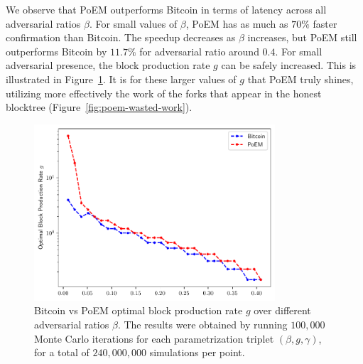 


%
%


We observe that PoEM outperforms Bitcoin in terms of latency across all adversarial ratios $\beta$.
For small values of $\beta$, PoEM has as much as $70\%$ faster confirmation than Bitcoin.
The speedup decreases as $\beta$ increases, but PoEM still outperforms Bitcoin by $11.7\%$ for adversarial ratio around $0.4$.
For small adversarial presence, the block production rate $g$ can be safely increased. This is illustrated in Figure~\ref{fig:g}.
It is for these larger values of $g$ that PoEM truly shines, utilizing more effectively the work of the
forks that appear in the honest blocktree (Figure~\ref{fig:poem-wasted-work}).

\begin{figure}[h]
    \centering
    \includegraphics[width = 0.8\textwidth]{figures/g.pdf}

    \caption{Bitcoin vs PoEM optimal block production rate $g$ over different adversarial ratios $\beta$.
             The results were obtained by running $100{,}000$ Monte Carlo iterations for each parametrization triplet
             $(\beta, g, \gamma)$, for a total of $240{,}000{,}000$ simulations per point.}
    \label{fig:g}
\end{figure}

